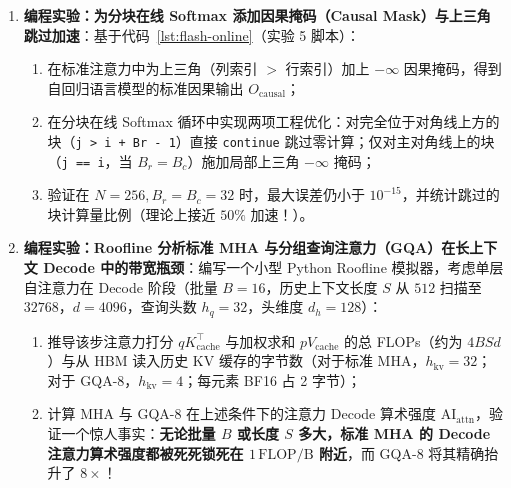 \begin{enumerate}
  \item[\textbf{6.5.7}] \textbf{编程实验：为分块在线 Softmax 添加因果掩码（Causal Mask）与上三角跳过加速}：基于代码~\ref{lst:flash-online}（实验 5 脚本）：
  \begin{enumerate}
    \item 在标准注意力中为上三角（列索引 $>$ 行索引）加上 $-\infty$ 因果掩码，得到自回归语言模型的标准因果输出 $O_{\mathrm{causal}}$；
    \item 在分块在线 Softmax 循环中实现两项工程优化：对完全位于对角线上方的块（\texttt{j > i + Br - 1}）直接 \texttt{continue} 跳过零计算；仅对主对角线上的块（\texttt{j == i}，当 $B_r = B_c$）施加局部上三角 $-\infty$ 掩码；
    \item 验证在 $N = 256, B_r = B_c = 32$ 时，最大误差仍小于 $10^{-15}$，并统计跳过的块计算量比例（理论上接近 $50\%$ 加速！）。
  \end{enumerate}

  \item[\textbf{6.5.8}] \textbf{编程实验：Roofline 分析标准 MHA 与分组查询注意力（GQA）在长上下文 Decode 中的带宽瓶颈}：编写一个小型 Python Roofline 模拟器，考虑单层自注意力在 Decode 阶段（批量 $B = 16$，历史上下文长度 $S$ 从 $512$ 扫描至 $32768$，$d = 4096$，查询头数 $h_q = 32$，头维度 $d_h = 128$）：
  \begin{enumerate}
    \item 推导该步注意力打分 $q K_{\mathrm{cache}}^\top$ 与加权求和 $p V_{\mathrm{cache}}$ 的总 FLOPs（约为 $4 B S d$）与从 HBM 读入历史 KV 缓存的字节数（对于标准 MHA，$h_{\mathrm{kv}} = 32$；对于 GQA-8，$h_{\mathrm{kv}} = 4$；每元素 BF16 占 2 字节）；
    \item 计算 MHA 与 GQA-8 在上述条件下的注意力 Decode 算术强度 $\mathrm{AI}_{\mathrm{attn}}$，验证一个惊人事实：\textbf{无论批量 $B$ 或长度 $S$ 多大，标准 MHA 的 Decode 注意力算术强度都被死死锁死在 $1\,\mathrm{FLOP/B}$ 附近}，而 GQA-8 将其精确抬升了 $8\times$！
  \end{enumerate}
\end{enumerate}
